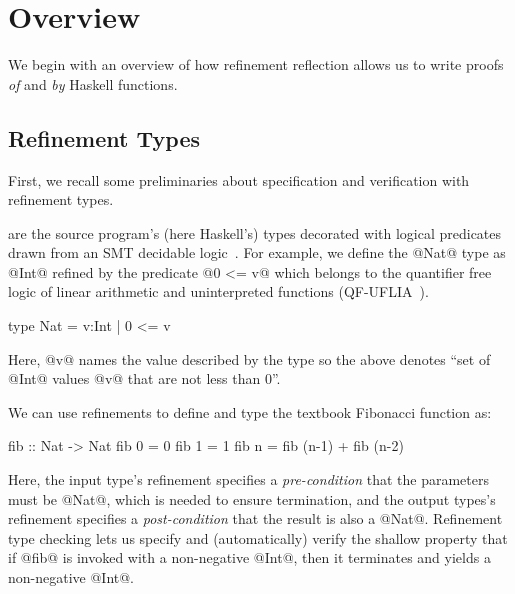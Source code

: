 \section{Overview}
\label{sec:overview}
\label{sec:examples}

We begin with an overview of how refinement reflection
allows us to write proofs \emph{of} and \emph{by}
Haskell functions.

\subsection{Refinement Types}

First, we recall some preliminaries about specification
and verification with refinement types.


 are the source program's (here
Haskell's) types decorated with logical predicates drawn
from an SMT decidable logic~\citep{ConstableS87,Rushby98}.
%
For example, we define the @Nat@ type as
@Int@ refined by the predicate @0 <= v@
which belongs to the quantifier free
logic of linear arithmetic and
uninterpreted functions (QF-UFLIA~\cite{SMTLIB2}).
%
\begin{code}
    type Nat = { v:Int | 0 <= v }
\end{code}
%
Here, @v@ names the value described by the type so
the above denotes ``set of @Int@ values @v@ that are not less than 0''.

%
We can use refinements to define and type the
textbook Fibonacci function as:
%
\begin{code}
    fib :: Nat -> Nat
    fib 0 = 0
    fib 1 = 1
    fib n = fib (n-1) + fib (n-2)
\end{code}
%
Here, the input type's refinement specifies a
\emph{pre-condition} that the parameters must
be @Nat@, which is needed to ensure termination,
and the output types's refinement specifies a
\emph{post-condition} that the result is also a @Nat@.
%
Refinement type checking lets us specify
and (automatically) verify the shallow property
that if @fib@ is invoked with a non-negative
@Int@, then it terminates and yields
a non-negative @Int@.


